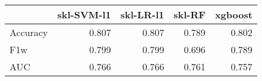 \begin{tabular}{lrrrr}
\toprule
{} &  skl-SVM-l1 &  skl-LR-l1 &  skl-RF &  xgboost \\
\midrule
Accuracy &       0.807 &      0.807 &   0.789 &    0.802 \\
F1w      &       0.799 &      0.799 &   0.696 &    0.789 \\
AUC      &       0.766 &      0.766 &   0.761 &    0.757 \\
\bottomrule
\end{tabular}
